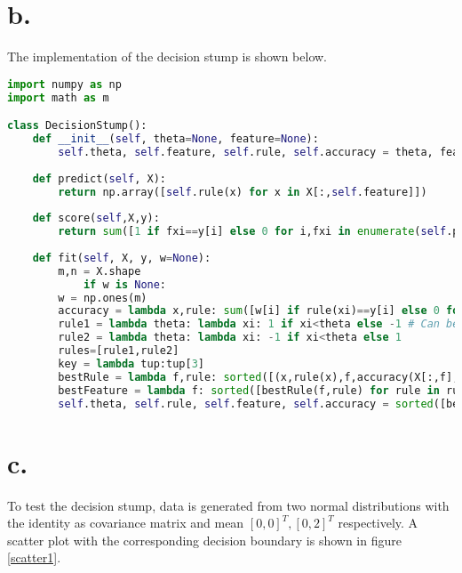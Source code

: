 \documentclass [a4paper] {report}
\begin{document}
	\section*{b.}
	The implementation of the decision stump is shown below.
	
	\begin{lstlisting}[language=python, frame=l, basicstyle=\ttfamily\scriptsize]
import numpy as np
import math as m

class DecisionStump():
	def __init__(self, theta=None, feature=None):
		self.theta, self.feature, self.rule, self.accuracy = theta, feature, None, None
	
	def predict(self, X):
		return np.array([self.rule(x) for x in X[:,self.feature]])
	
	def score(self,X,y):
		return sum([1 if fxi==y[i] else 0 for i,fxi in enumerate(self.predict(X))])/y.shape[0]
	
	def fit(self, X, y, w=None):
		m,n = X.shape
			if w is None:
		w = np.ones(m)
		accuracy = lambda x,rule: sum([w[i] if rule(xi)==y[i] else 0 for (i,xi) in enumerate(x)])/sum(w)
		rule1 = lambda theta: lambda xi: 1 if xi<theta else -1 # Can be partially applied
		rule2 = lambda theta: lambda xi: -1 if xi<theta else 1
		rules=[rule1,rule2]
		key = lambda tup:tup[3]
		bestRule = lambda f,rule: sorted([(x,rule(x),f,accuracy(X[:,f],rule(x))) for x in X[:,f]],key=key)[-1] 
		bestFeature = lambda f: sorted([bestRule(f,rule) for rule in rules],key=key)[-1]
		self.theta, self.rule, self.feature, self.accuracy = sorted([bestFeature(f) for f in range(0,n)],key=key)[-1]
	\end{lstlisting}
	
	\section*{c.}
	To test the decision stump, data is generated from two normal distributions with the identity as covariance matrix and mean $[0,0]^{T}, [0,2]^{T}$ respectively. A scatter plot with the corresponding decision boundary is shown in figure \ref{scatter1}.
\end{document}
